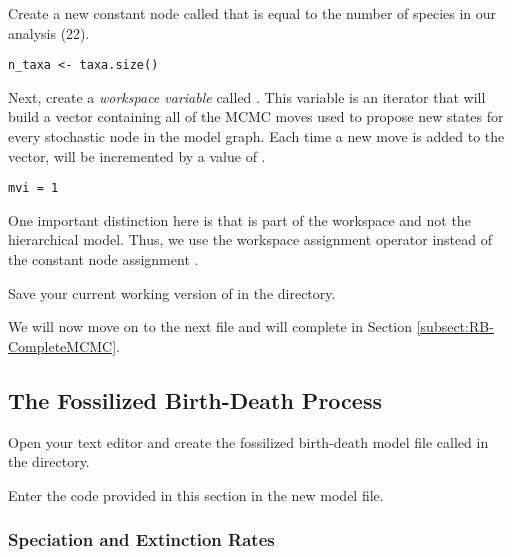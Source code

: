Create a new constant node called  that is equal to the number of species in our analysis (22). 
{\tt \begin{snugshade*}
\begin{lstlisting}
n_taxa <- taxa.size() 
\end{lstlisting}
\end{snugshade*}}

Next, create a \textit{workspace variable} called . 
This variable is an iterator that will build a vector containing all of the MCMC moves used to propose new states for every stochastic node in the model graph. 
Each time a new move is added to the vector,  will be incremented by a value of .
{\tt \begin{snugshade*}
\begin{lstlisting}
mvi = 1
\end{lstlisting}
\end{snugshade*}}
One important distinction here is that  is part of the \RevBayes workspace and not the hierarchical model. 
Thus, we use the workspace assignment operator \cl{=} instead of the constant node assignment \cl{<-}. 

{\begin{framed}
Save your current working version of  in the  directory.

We will now move on to the next \Rev file and will complete  in Section \ref{subsect:RB-CompleteMCMC}.
\end{framed}}


\bigskip
\subsection{The Fossilized Birth-Death Process}\label{subsect:RB-ModelFBD}

{\begin{framed}
Open your text editor and create the fossilized birth-death model file called {\textcolor{red}{}} in the  directory.

Enter the \Rev code provided in this section in the new model file.
\end{framed}}

\subsubsection{Speciation and Extinction Rates}\label{subsub:RB-FBD-SpeciationExtinction}

